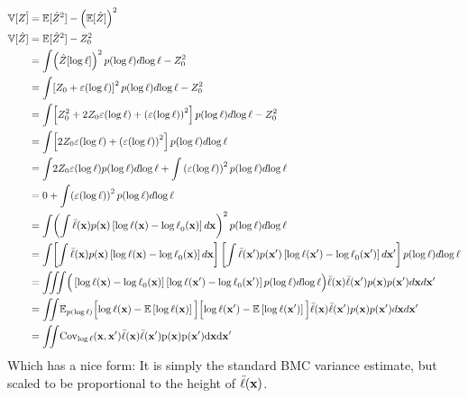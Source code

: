 \begin{align}
\var[Z\hat ] & = \expect[\hat Z^2] - \left(\expect[\hat Z]\right)^2 \\
\var[\hat Z] & = \expect[\hat Z^2] - Z_0^2 \\
 & = \int\! \left( \hat Z[\lftwo]\right)^2 p(\lftwo) d\lftwo - Z_0^2 \\
 & = \int\! \left[ Z_0 + \varepsilon(\lftwo)\right]^2 p(\lftwo) d\lftwo - Z_0^2 \\
 & = \int\! \left[ Z_0^2 + 2 Z_0\varepsilon(\lftwo) + \left(\varepsilon(\lftwo)\right)^2\right] p(\lftwo) d\lftwo - Z_0^2\\
& = \int\! \left[ 2 Z_0\varepsilon(\lftwo) + \left(\varepsilon(\lftwo)\right)^2\right] p(\lftwo) d\lftwo\\ 
& = \int\!  2 Z_0\varepsilon(\lftwo)p(\lftwo) d\lftwo + \int  \left(\varepsilon(\lftwo)\right)^2 p(\lftwo) d\lftwo\\ 
& = 0 + \int\! \left(\varepsilon(\lftwo)\right)^2 p(\lftwo) d\lftwo\\ 
& = \int\! \left(\int \mftwo(\vx) p(\vx)\left[\lftwo(\vx) - \lftwo_0(\vx)\right] d\vx\right)^2 p(\lftwo) d\lftwo\\ 
& = \int\! \left[\int \mftwo(\vx) p(\vx)\left[\lftwo(\vx) - \lftwo_0(\vx)\right] d\vx\right] \left[\int \mftwo(\vx') p(\vx')\left[\lftwo(\vx') - \lftwo_0(\vx')\right] d\vx'\right] p(\lftwo) d\lftwo \nonumber\\
& = \int\!\!\! \int\!\!\! \int\! \Big( \left[\lftwo(\vx) - \lftwo_0(\vx)\right] \left[\lftwo(\vx') - \lftwo_0(\vx')\right] p(\lftwo) d\lftwo \Big) \mftwo(\vx) \mftwo(\vx') p(\vx) p(\vx') d\vx d\vx' \nonumber\\
& = \int\!\!\! \int\! \expect_{p(\lftwo)} \Big[ \lftwo(\vx) - \expect \left[ \lftwo(\vx ) \right] \Big] \Big[ \lftwo(\vx') - \expect \left[ \lftwo(\vx' ) \right] \Big] \mftwo(\vx) \mftwo(\vx') p(\vx) p(\vx') d\vx d\vx' \nonumber\\
& = \int\!\!\! \int\! \rm{Cov}_{\lftwo}(\vx, \vx') \mftwo(\vx) \mftwo(\vx') p(\vx) p(\vx') d\vx d\vx'
\label{eq:vz}
\end{align}
Which has a nice form:  It is simply the standard BMC variance estimate, but scaled to be proportional to the height of ${\bar \ell}({\bf{x}})$.


